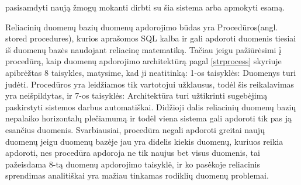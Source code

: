 \documentclass{VUMIFPSkursinis}
\begin{document}
    pasisamdyti naują žmogų mokanti dirbti su šia sistema arba apmokyti esamą. \par
        Reliacinių duomenų bazių duomenų apdorojimo būdas yra Procedūros(angl. stored procedures), kurios aprašomos SQL kalba ir gali apdoroti duomenis tiesiai iš duomenų bazės 
    naudojant reliacinę matematiką. Tačiau jeigu pažiūrėsimi į procedūrą, kaip duomenų apdorojimo architektūrą pagal \ref{strprocess} skyriuje apibrėžtas 8 taisykles, 
    matysime, kad ji neatitinką: 1-os taisyklės: Duomenys turi judėti. Procedūros yra leidžiamos tik vartotojui užklausus, todėl šis reikalavimas yra neišpildytas, 
    ir 7-os taisyklės: Architektūra turi užtikrinti sugebėjimą paskirstyti sistemos darbus automatiškai. Didžioji dalis reliacinių duomenų bazių nepalaiko horizontalų 
    plečiamumą\cite{cattelsql, jkubas} ir todėl viena sistema gali apdoroti tik pas ją esančius duomenis. Svarbiausiai, procedūra negali apdoroti greitai naujų duomenų jeigu duomenų bazėje 
    jau yra didelis kiekis duomenų, kuriuos reikia apdoroti, nes procedūra apdoroja ne tik naujus bet visus duomenis, tai pažeisdama 8-tą duomenų apdorojimo taisyklė,
    ir ko pasėkoje reliacinis sprendimas analitiškai yra mažiau tinkamas rodiklių duomenų problemai.




\end{document}
